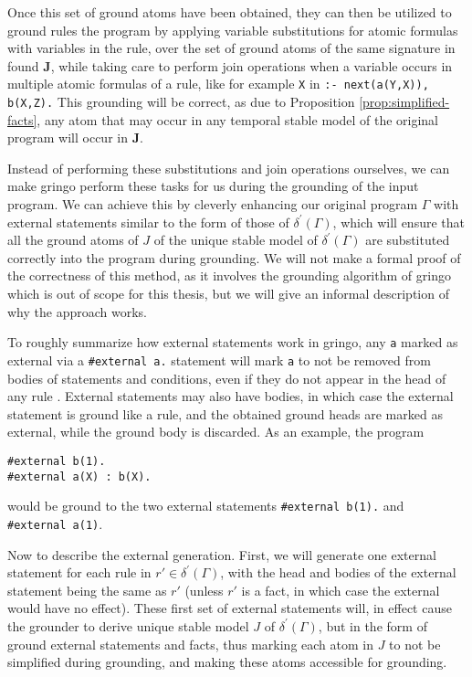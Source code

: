 Once this set of ground atoms have been obtained, they can then be
utilized to ground rules the program by applying variable
substitutions for atomic formulas with variables in the rule, over the
set of ground atoms of the same signature in found $\bm{J}$, while
taking care to perform join operations when a variable occurs in
multiple atomic formulas of a rule, like for example \verb|X| in
\verb|:- next(a(Y,X)), b(X,Z).| This grounding will be correct, as due
to Proposition \ref{prop:simplified-facts}, any atom that may occur in
any temporal stable model of the original program will occur in
$\bm{J}$.

Instead of performing these substitutions and join operations
ourselves, we can make gringo perform these tasks for us during the
grounding of the input program. We can achieve this by cleverly
enhancing our original program $\Gamma$ with external statements
similar to the form of those of $\delta^\prime(\Gamma)$, which will
ensure that all the ground atoms of $J$ of the unique stable model of
$\delta^\prime(\Gamma)$ are substituted correctly into the program
during grounding. We will not make a formal proof of the correctness
of this method, as it involves the grounding algorithm of gringo which
is out of scope for this thesis, but we will give an informal
description of why the approach works.

To roughly summarize how external statements work in gringo, any
\verb|a| marked as external via a \verb|#external a.| statement will
mark \verb|a| to not be removed from bodies of statements and
conditions, even if they do not appear in the head of any rule
\cite{PotasscoUserGuide19}. External statements may also have bodies,
in which case the external statement is ground like a rule, and the
obtained ground heads are marked as external, while the ground body is
discarded. As an example, the program
\begin{lstlisting}[language=clingo]
#external b(1).
#external a(X) : b(X).
\end{lstlisting}
would be ground to the two external statements \verb|#external b(1).|
and \\\verb|#external a(1)|.

Now to describe the external generation. First, we will generate one
external statement for each rule in $r' \in \delta^\prime(\Gamma)$,
with the head and bodies of the external statement being the same as
$r'$ (unless $r'$ is a fact, in which case the external would have no
effect). These first set of external statements will, in effect cause
the grounder to derive unique stable model $J$ of
$\delta^\prime(\Gamma)$, but in the form of ground external statements
and facts, thus marking each atom in $J$ to not be simplified during
grounding, and making these atoms accessible for grounding.

